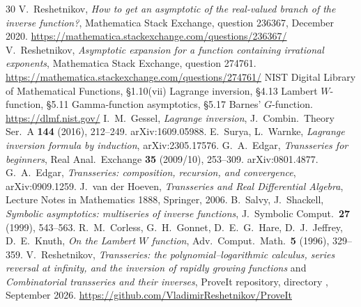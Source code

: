 \documentclass[11pt,a4paper]{article}
\numberwithin{equation}{section}
\theoremstyle{plain}
\theoremstyle{definition}
\theoremstyle{remark}
\begin{document}
\clearpage
\begin{thebibliography}{30}
 V.~Reshetnikov, \emph{How to get an asymptotic of the real-valued branch of the inverse function?}, Mathematica Stack Exchange, question 236367, December 2020. \url{https://mathematica.stackexchange.com/questions/236367/}
 V.~Reshetnikov, \emph{Asymptotic expansion for a function containing irrational exponents}, Mathematica Stack Exchange, question 274761. \url{https://mathematica.stackexchange.com/questions/274761/}
 NIST Digital Library of Mathematical Functions, \S1.10(vii) Lagrange inversion, \S4.13 Lambert $W$-function, \S5.11 Gamma-function asymptotics, \S5.17 Barnes' $G$-function. \url{https://dlmf.nist.gov/}
 I.~M.~Gessel, \emph{Lagrange inversion}, J.\ Combin.\ Theory Ser.\ A \textbf{144} (2016), 212--249. arXiv:1609.05988.
 E.~Surya, L.~Warnke, \emph{Lagrange inversion formula by induction}, arXiv:2305.17576.
 G.~A.~Edgar, \emph{Transseries for beginners}, Real Anal.\ Exchange \textbf{35} (2009/10), 253--309. arXiv:0801.4877.
 G.~A.~Edgar, \emph{Transseries: composition, recursion, and convergence}, arXiv:0909.1259.
 J.~van der Hoeven, \emph{Transseries and Real Differential Algebra}, Lecture Notes in Mathematics 1888, Springer, 2006.
 B.~Salvy, J.~Shackell, \emph{Symbolic asymptotics: multiseries of inverse functions}, J.\ Symbolic Comput.\ \textbf{27} (1999), 543--563.
 R.~M.~Corless, G.~H.~Gonnet, D.~E.~G.~Hare, D.~J.~Jeffrey, D.~E.~Knuth, \emph{On the Lambert $W$ function}, Adv.\ Comput.\ Math.\ \textbf{5} (1996), 329--359.
 V.~Reshetnikov, \emph{Transseries: the polynomial--logarithmic calculus, series reversal at infinity, and the inversion of rapidly growing functions} and \emph{Combinatorial transseries and their inverses}, ProveIt repository, directory , September 2026. \url{https://github.com/VladimirReshetnikov/ProveIt}
\end{thebibliography}
\end{document}
